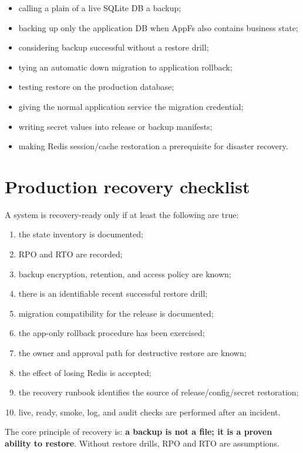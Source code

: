 \begin{itemize}
  \item calling a plain  of a live SQLite DB a backup;
  \item backing up only the application DB when AppFs also contains business state;
  \item considering backup successful without a restore drill;
  \item tying an automatic down migration to application rollback;
  \item testing restore on the production database;
  \item giving the normal application service the migration credential;
  \item writing secret values into release or backup manifests;
  \item making Redis session/cache restoration a prerequisite for disaster recovery.
\end{itemize}

\section{Production recovery checklist}

A system is recovery-ready only if at least the following are true:

\begin{enumerate}
  \item the state inventory is documented;
  \item RPO and RTO are recorded;
  \item backup encryption, retention, and access policy are known;
  \item there is an identifiable recent successful restore drill;
  \item migration compatibility for the release is documented;
  \item the app-only rollback procedure has been exercised;
  \item the owner and approval path for destructive restore are known;
  \item the effect of losing Redis is accepted;
  \item the recovery runbook identifies the source of release/config/secret restoration;
  \item live, ready, smoke, log, and audit checks are performed after an incident.
\end{enumerate}

The core principle of recovery is: \textbf{a backup is not a file; it is a proven ability to restore}. Without restore drills, RPO and RTO are assumptions.

